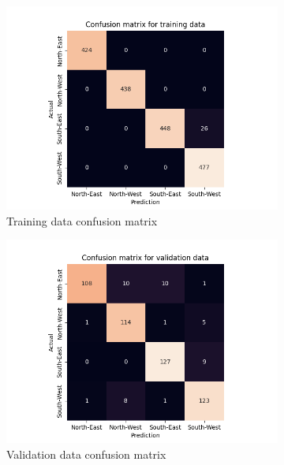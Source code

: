 \documentclass[10pt,twocolumn,letterpaper]{article}
\begin{document}
\begin{figure}
  \centering
  \begin{subfigure}{.33\linewidth}
    \includegraphics[width=\linewidth, trim={7em, 0em, 9em, 5em}, clip]{cnn_cfsn_train}
    \caption{Training data confusion matrix}
    \label{fig:cnn_train}
  \end{subfigure}
  \begin{subfigure}{0.33\linewidth}
    \includegraphics[width=\linewidth, trim={7em, 0em, 9em, 5em}, clip]{cnn_cfsn_valid}
    \caption{Validation data confusion matrix}
    \label{fig:cnn_valid}
  \end{subfigure}
  \begin{subfigure}{0.33\linewidth}

\end{subfigure}
\end{figure}
\end{document}
